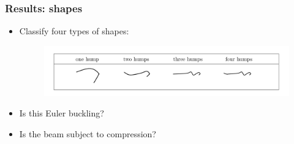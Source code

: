 \documentclass{beamer}
\begin{document}


\begin{frame}
	\frametitle{Results: shapes}
	\begin{overlayarea}{\textwidth}{\textheight}
		\begin{itemize}
			\item Classify four types of shapes: \vspace{-0.3cm}
			\begin{figure}[htb]
				\begin{center}
					\includegraphics[width=1\textwidth]{plots/deformations.png}
				\end{center}
			\end{figure}
			\item Is this Euler buckling?
			\item Is the beam subject to compression?
		\end{itemize}
	\end{overlayarea}
\end{frame}



\end{document}

